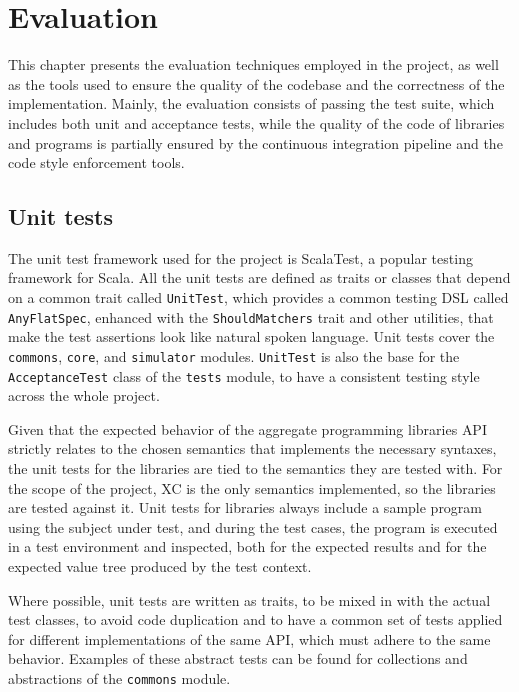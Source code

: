 \chapter{Evaluation}
\label{chap:evaluation}

This chapter presents the evaluation techniques employed in the project, as well as the tools used to ensure the quality of the codebase and the correctness of the implementation.
%
Mainly, the evaluation consists of passing the test suite, which includes both unit and acceptance tests, while the quality of the code of libraries and programs is partially ensured by the continuous integration pipeline and the code style enforcement tools.

\section{Unit tests}

The unit test framework used for the project is ScalaTest, a popular testing framework for Scala.
%
All the unit tests are defined as traits or classes that depend on a common trait called \texttt{UnitTest}, which provides a common testing \ac{DSL} called \texttt{AnyFlatSpec}, enhanced with the \texttt{ShouldMatchers} trait and other utilities, that make the test assertions look like natural spoken language.
%
Unit tests cover the \texttt{commons}, \texttt{core}, and \texttt{simulator} modules.
%
\texttt{UnitTest} is also the base for the \texttt{AcceptanceTest} class of the \texttt{tests} module, to have a consistent testing style across the whole project.

Given that the expected behavior of the aggregate programming libraries \ac{API} strictly relates to the chosen semantics that implements the necessary syntaxes, the unit tests for the libraries are tied to the semantics they are tested with.
%
For the scope of the project, \ac{XC} is the only semantics implemented, so the libraries are tested against it.
%
Unit tests for libraries always include a sample program using the subject under test, and during the test cases, the program is executed in a test environment and inspected, both for the expected results and for the expected value tree produced by the test context.

Where possible, unit tests are written as traits, to be mixed in with the actual test classes, to avoid code duplication and to have a common set of tests applied for different implementations of the same \ac{API}, which must adhere to the same behavior.
%
Examples of these abstract tests can be found for collections and abstractions of the \texttt{commons} module.

